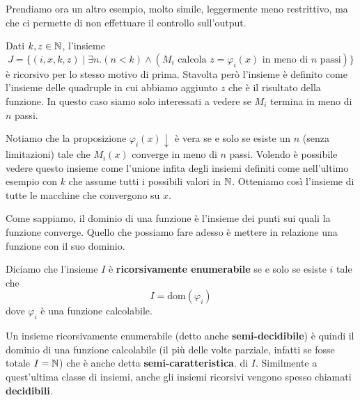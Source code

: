 Prendiamo ora un altro esempio, molto simile, leggermente meno
restrittivo, ma che ci permette di non effettuare il controllo
sull'output.

\begin{example}
	Dati $k, z \in \mathbb{N}$, l'insieme
	\[
		J = \{ (i,x,k,z) \mid \exists n . (n < k)
		\land (M_i \text{ calcola } z = \varphi_i (x)
		\text{ in meno di } n \text{ passi}) \}
	\]
	è ricorsivo per lo stesso motivo di prima. Stavolta però
	l'insieme è definito come l'insieme delle quadruple in cui
	abbiamo aggiunto $z$ che è il risultato della funzione. In
	questo caso siamo solo interessati a vedere se $M_i$ termina
	in meno di $n$ passi.
\end{example}

Notiamo che la proposizione $\varphi_i (x) \downarrow$ è vera se
e solo se esiste un $n$ (senza limitazioni) tale che
$M_i(x)$ converge in meno di $n$ passi. Volendo è possibile
vedere questo insieme come l'unione infita degli insiemi
definiti come nell'ultimo esempio con $k$ che assume tutti i
possibili valori in $\mathbb{N}$. Otteniamo così l'insieme di tutte le
macchine che convergono su $x$.

Come sappiamo, il dominio di una funzione è l'insieme dei punti
sui quali la funzione converge. Quello che possiamo fare adesso
è mettere in relazione una funzione con il suo dominio.

\begin{definition} \label{def: rec_enum}
	Diciamo che l'insieme $I$ è \textbf{ricorsivamente enumerabile}
	se e solo se esiste $i$ tale che
	\[ I = \text{dom}(\varphi_i) \]
	dove $\varphi_i$ è una funzione calcolabile.
\end{definition}

Un insieme ricorsivamente enumerabile (detto anche
\textbf{semi-decidibile}) è quindi il dominio di una funzione
calcolabile (il più delle volte parziale, infatti se fosse
totale $I = \mathbb{N}$) che è anche detta \textbf{semi-caratteristica}.
di $I$. Similmente a quest'ultima classe di insiemi, anche gli
insiemi ricorsivi vengono spesso chiamati \textbf{decidibili}.



